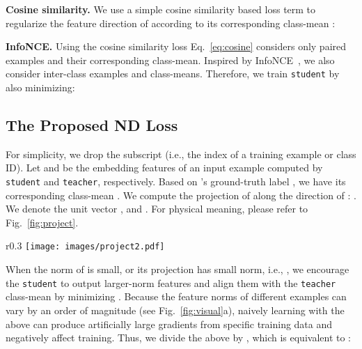 \documentclass{article}
\begin{document}
\textbf{Cosine similarity.} 
We use a simple cosine similarity based loss term to regularize the feature direction of  according to its corresponding class-mean :


\textbf{InfoNCE.}
Using the cosine similarity loss Eq.~\ref{eq:cosine} considers only paired examples and their corresponding class-mean.
Inspired by InfoNCE~\cite{oord2018representation}, we  also consider inter-class examples and class-means.
Therefore, we train {\tt student} by also minimizing:
















\subsection{The Proposed ND Loss}







For simplicity, we drop the subscript (i.e., the index of a  training example or class ID).
Let  and  be the embedding features of an input example  computed by {\tt student} and {\tt teacher}, respectively.
Based on 's ground-truth label , we have its corresponding class-mean .
We compute the projection of  along the direction of : 
.
We denote the unit vector ,
and .
For physical meaning, please refer to  Fig.~\ref{fig:project}.









\begin{wrapfigure}{r}{0.3\textwidth}
\centering
\vspace{-7mm}
\texttt{[image: images/project2.pdf]}
\vspace{-2mm}
\caption{
\small
Illustration of notations used in our ND loss.}
\vspace{-2mm}
\label{fig:project} 
\end{wrapfigure} 



When the norm of   is small, or its projection  has small norm, i.e., 
 , 
we encourage the {\tt student} to output larger-norm features and align them with the {\tt teacher} class-mean by minimizing
.
Because the feature norms of different examples can vary by an order of magnitude (see Fig.~\ref{fig:visual}a), naively learning with the above can produce artificially large gradients from specific training data and negatively affect training.
Thus, we divide the above by , which is equivalent to :
\end{document}
